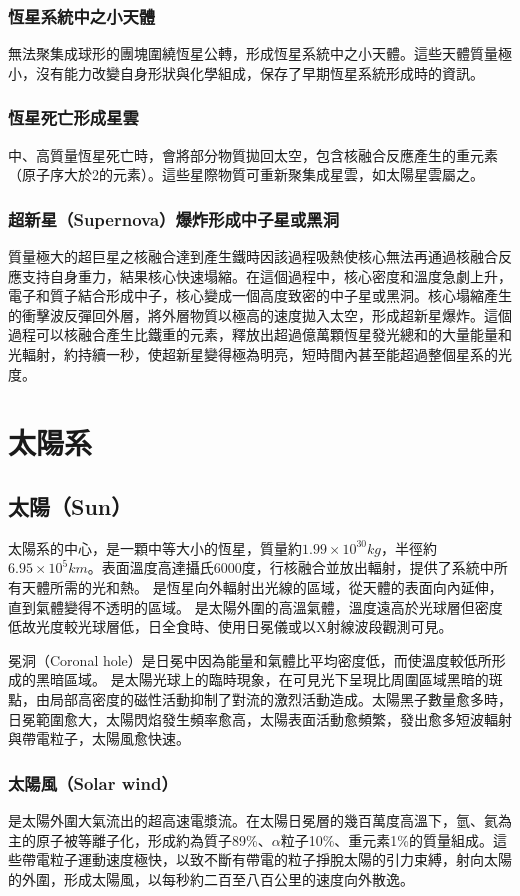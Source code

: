 \documentclass[a4paper,12pt]{report}
\begin{document}
\subsubsection{恆星系統中之小天體}
無法聚集成球形的團塊圍繞恆星公轉，形成恆星系統中之小天體。這些天體質量極小，沒有能力改變自身形狀與化學組成，保存了早期恆星系統形成時的資訊。
\subsubsection{恆星死亡形成星雲}
中、高質量恆星死亡時，會將部分物質拋回太空，包含核融合反應產生的重元素（原子序大於2的元素）。這些星際物質可重新聚集成星雲，如太陽星雲屬之。
\subsubsection{超新星（Supernova）爆炸形成中子星或黑洞}
質量極大的超巨星之核融合達到產生鐵時因該過程吸熱使核心無法再通過核融合反應支持自身重力，結果核心快速塌縮。在這個過程中，核心密度和溫度急劇上升，電子和質子結合形成中子，核心變成一個高度致密的中子星或黑洞。核心塌縮產生的衝擊波反彈回外層，將外層物質以極高的速度拋入太空，形成超新星爆炸。這個過程可以核融合產生比鐵重的元素，釋放出超過億萬顆恆星發光總和的大量能量和光輻射，約持續一秒，使超新星變得極為明亮，短時間內甚至能超過整個星系的光度。
\section{太陽系}
\subsection{太陽（Sun）}
太陽系的中心，是一顆中等大小的恆星，質量約$1.99\times 10^{30} kg$，半徑約$6.95\times 10^5 km$。表面溫度高達攝氏6000度，行核融合並放出輻射，提供了系統中所有天體所需的光和熱。
是恆星向外輻射出光線的區域，從天體的表面向內延伸，直到氣體變得不透明的區域。
是太陽外圍的高溫氣體，溫度遠高於光球層但密度低故光度較光球層低，日全食時、使用日冕儀或以X射線波段觀測可見。

冕洞（Coronal hole）是日冕中因為能量和氣體比平均密度低，而使溫度較低所形成的黑暗區域。
是太陽光球上的臨時現象，在可見光下呈現比周圍區域黑暗的斑點，由局部高密度的磁性活動抑制了對流的激烈活動造成。太陽黑子數量愈多時，日冕範圍愈大，太陽閃焰發生頻率愈高，太陽表面活動愈頻繁，發出愈多短波輻射與帶電粒子，太陽風愈快速。
\subsubsection{太陽風（Solar wind）}
是太陽外圍大氣流出的超高速電漿流。在太陽日冕層的幾百萬度高溫下，氫、氦為主的原子被等離子化，形成約為質子89\%、$\alpha$粒子10\%、重元素1\%的質量組成。這些帶電粒子運動速度極快，以致不斷有帶電的粒子掙脫太陽的引力束縛，射向太陽的外圍，形成太陽風，以每秒約二百至八百公里的速度向外散逸。
\end{document}
